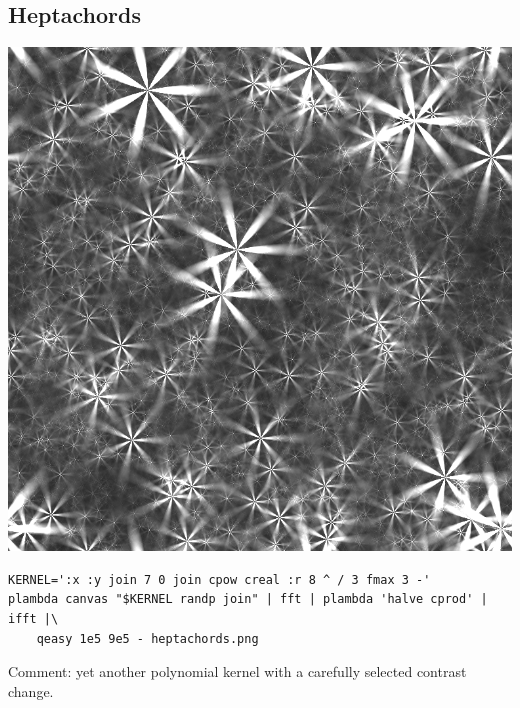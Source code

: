 \subsection{Heptachords}
\includegraphics{heptachords.png}
\begin{verbatim}
KERNEL=':x :y join 7 0 join cpow creal :r 8 ^ / 3 fmax 3 -'
plambda canvas "$KERNEL randp join" | fft | plambda 'halve cprod' | ifft |\
	qeasy 1e5 9e5 - heptachords.png
\end{verbatim}
Comment: yet another polynomial kernel with a carefully selected contrast
change.


